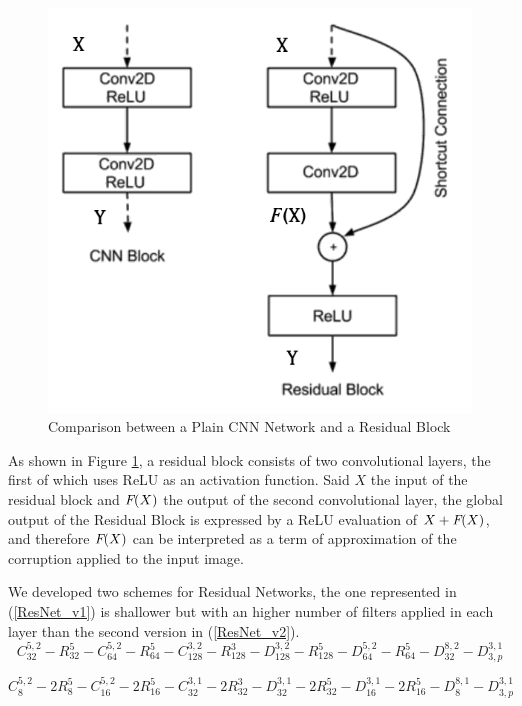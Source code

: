 \documentclass[12pt,a4paper]{article}
\begin{document}
\begin{figure}[hbtp]
\centering
\includegraphics[scale=0.5]{ResidualBlock.png}
\caption{Comparison between a Plain CNN Network and a Residual Block}\label{ResNet}
\end{figure}

As shown in Figure \ref{ResNet}, a residual block consists of two convolutional layers, the first of which uses ReLU as an activation function. Said $X$ the input of the residual block and $\emph{F}(X)$ the output of the second convolutional layer, the global output of the Residual Block is expressed by a ReLU evaluation of $X +\emph{F}(X) $, and therefore $\emph{F}(X)$ can be interpreted as a term of approximation of the corruption applied to the input image.

We developed two schemes for Residual Networks, the one represented in (\ref{ResNet_v1}) is shallower but with an higher number of filters applied in each layer than the second version in (\ref{ResNet_v2}).
\begin{equation}
C_{32}^{5,2} - R_{32}^5 - C_{64}^{5,2} - R_{64}^5 - C_{128}^{3,2} - R_{128}^3 - D_{128}^{3,2} - R_{128}^5 - D_{64}^{5,2} - R_{64}^5 - D_{32}^{8,2} - D_{3,p}^{3,1} 
\label{ResNet_v1}
\end{equation}

\begin{equation}
C_{8}^{5,2} - 2R_{8}^5 - C_{16}^{5,2} - 2R_{16}^5 - C_{32}^{3,1} - 2R_{32}^3 - D_{32}^{3,1} - 2R_{32}^5 - D_{16}^{3,1} - 2R_{16}^5 - D_{8}^{8,1} - D_{3,p}^{3,1} 
\label{ResNet_v2}
\end{equation}
\end{document}
